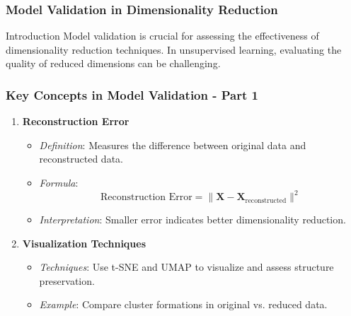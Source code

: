 \documentclass[aspectratio=169]{beamer}
\begin{document}
\begin{frame}[fragile]
    \frametitle{Model Validation in Dimensionality Reduction}
    \begin{block}{Introduction}
        Model validation is crucial for assessing the effectiveness of dimensionality reduction techniques.
        In unsupervised learning, evaluating the quality of reduced dimensions can be challenging.
    \end{block}
\end{frame}

\begin{frame}[fragile]
    \frametitle{Key Concepts in Model Validation - Part 1}
    \begin{enumerate}
        \item \textbf{Reconstruction Error}
        \begin{itemize}
            \item \textit{Definition}: Measures the difference between original data and reconstructed data.
            \item \textit{Formula}:
            \begin{equation}
            \text{Reconstruction Error} = \| \mathbf{X} - \mathbf{X}_{\text{reconstructed}} \|^2
            \end{equation}
            \item \textit{Interpretation}: Smaller error indicates better dimensionality reduction.
        \end{itemize}

        \item \textbf{Visualization Techniques}
        \begin{itemize}
            \item \textit{Techniques}: Use t-SNE and UMAP to visualize and assess structure preservation.
            \item \textit{Example}: Compare cluster formations in original vs. reduced data.
        \end{itemize}
    \end{enumerate}
\end{frame}
\end{document}
